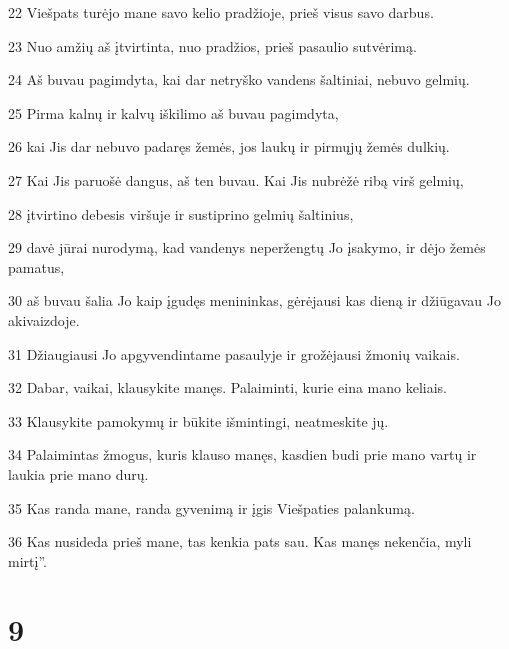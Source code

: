 \par 22 Viešpats turėjo mane savo kelio pradžioje, prieš visus savo darbus. 
\par 23 Nuo amžių aš įtvirtinta, nuo pradžios, prieš pasaulio sutvėrimą. 
\par 24 Aš buvau pagimdyta, kai dar netryško vandens šaltiniai, nebuvo gelmių. 
\par 25 Pirma kalnų ir kalvų iškilimo aš buvau pagimdyta, 
\par 26 kai Jis dar nebuvo padaręs žemės, jos laukų ir pirmųjų žemės dulkių. 
\par 27 Kai Jis paruošė dangus, aš ten buvau. Kai Jis nubrėžė ribą virš gelmių, 
\par 28 įtvirtino debesis viršuje ir sustiprino gelmių šaltinius, 
\par 29 davė jūrai nurodymą, kad vandenys neperžengtų Jo įsakymo, ir dėjo žemės pamatus, 
\par 30 aš buvau šalia Jo kaip įgudęs menininkas, gėrėjausi kas dieną ir džiūgavau Jo akivaizdoje. 
\par 31 Džiaugiausi Jo apgyvendintame pasaulyje ir grožėjausi žmonių vaikais. 
\par 32 Dabar, vaikai, klausykite manęs. Palaiminti, kurie eina mano keliais. 
\par 33 Klausykite pamokymų ir būkite išmintingi, neatmeskite jų. 
\par 34 Palaimintas žmogus, kuris klauso manęs, kasdien budi prie mano vartų ir laukia prie mano durų. 
\par 35 Kas randa mane, randa gyvenimą ir įgis Viešpaties palankumą. 
\par 36 Kas nusideda prieš mane, tas kenkia pats sau. Kas manęs nekenčia, myli mirtį”.



\chapter{9}


